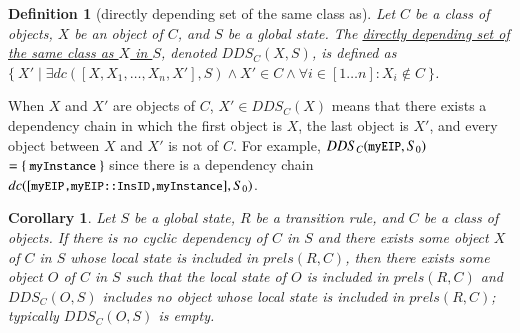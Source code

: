 \documentclass[12pt]{report}
\newtheorem{corollary}{Corollary}
\newtheorem{definition}{Definition}
\newcommand{\mbstt}[1]{\mbox{\small{\tt {#1}}}}
\newcommand{\ul}{\underline}
\begin{document}
\begin{definition}[directly depending set of the same class as]
Let $C$ be a class of objects, $X$ be an object of $C$, and $S$ be a
global state. The \ul{directly depending set of the same class as
  $X$ in $S$}, denoted \ul{$DDS_C(X,S)$}, is defined as
$\{~X'\mid\exists dc([X,X_1,\dots,X_n,X'],S)\land X' \in C\land\forall
i\in [1 \dots n]:X_i \not\in C~\}$.
\end{definition}
When $X$ and $X'$ are objects of $C$, $X' \in DDS_C(X)$ means that
there exists a dependency chain in which the first object is $X$, the
last object is $X'$, and every object between $X$ and $X'$ is not of
$C$. For example, $DDS_C(\mbstt{myEIP},S_0)$ $=\{~\mbstt{myInstance}~\}$
since there is a dependency chain
$dc([\mbstt{myEIP,myEIP::InsID,myInstance}],S_0)$.

\begin{corollary}
Let $S$ be a global state, $R$ be a transition rule, and $C$ be a
class of objects. If there is no cyclic dependency of $C$ in $S$ and
there exists some object $X$ of $C$ in $S$ whose local state is
included in $prels(R,C)$, then there exists some object $O$ of $C$ in
$S$ such that the local state of $O$ is included in $prels(R,C)$ and
$DDS_C(O,S)$ includes no object whose local state is included in
$prels(R,C)$; typically $DDS_C(O,S)$ is empty.
\end{corollary}
\end{document}
